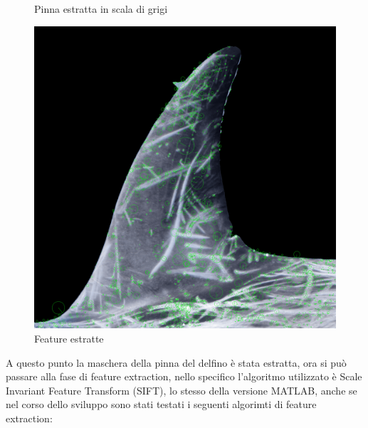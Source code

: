 \documentclass[a4paper,12pt]{report}
\begin{document}
\begin{figure}[H]
\begin{minipage}{0.3\textwidth}
        \caption{Pinna estratta in scala di grigi}
      \end{minipage}
      \begin{minipage}{0.3\textwidth}
        \centering
        \includegraphics[width=\textwidth]{assets/images/features_extraction/features.png}   
        \caption{Feature estratte}
      \end{minipage}
    \end{figure}
      A questo punto la maschera della pinna del delfino è stata estratta, 
      ora si può passare alla fase di feature extraction, nello specifico l'algoritmo utilizzato 
      è Scale Invariant Feature Transform (SIFT), lo stesso della versione MATLAB,
      anche se nel corso dello sviluppo sono stati testati i seguenti algorimti di feature extraction:
\end{document}
